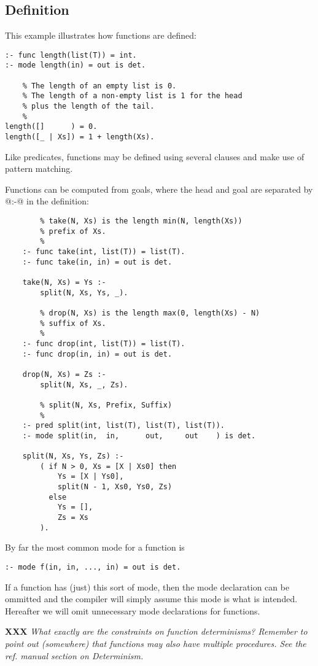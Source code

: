 \documentclass[a4paper,11pt,notitlepage,onecolumn]{article}
\newcommand{\XXX}[1]%
{{\small\textbf{XXX} \emph{#1}}}
\begin{document}
\subsection{Definition}

This example illustrates how functions are defined:
\begin{verbatim}
:- func length(list(T)) = int.
:- mode length(in) = out is det.

    % The length of an empty list is 0.
    % The length of a non-empty list is 1 for the head
    % plus the length of the tail.
    %
length([]      ) = 0.
length([_ | Xs]) = 1 + length(Xs).
\end{verbatim}
Like predicates, functions may be defined using several clauses
and make use of pattern matching.

Functions can be computed from goals, where the head and goal
are separated by @:-@ in the definition:
\begin{verbatim}
        % take(N, Xs) is the length min(N, length(Xs))
        % prefix of Xs.
        %
    :- func take(int, list(T)) = list(T).
    :- func take(in, in) = out is det.

    take(N, Xs) = Ys :-
        split(N, Xs, Ys, _).

        % drop(N, Xs) is the length max(0, length(Xs) - N)
        % suffix of Xs.
        %
    :- func drop(int, list(T)) = list(T).
    :- func drop(in, in) = out is det.

    drop(N, Xs) = Zs :-
        split(N, Xs, _, Zs).

        % split(N, Xs, Prefix, Suffix)
        %
    :- pred split(int, list(T), list(T), list(T)).
    :- mode split(in,  in,      out,     out    ) is det.

    split(N, Xs, Ys, Zs) :-
        ( if N > 0, Xs = [X | Xs0] then
            Ys = [X | Ys0],
            split(N - 1, Xs0, Ys0, Zs)
          else
            Ys = [],
            Zs = Xs
        ).
\end{verbatim}
By far the most common mode for a function is
\begin{verbatim}
:- mode f(in, in, ..., in) = out is det.
\end{verbatim}

If a function has (just) this sort of mode, then the mode
declaration can be ommitted and the compiler will simply assume
this mode is what is intended.  Hereafter we will omit unnecessary
mode declarations for functions.

\XXX{What exactly are the constraints on function
determinisms?  Remember to point out (somewhere) that
functions may also have multiple procedures.  See the ref.
manual section on Determinism.}
\end{document}

